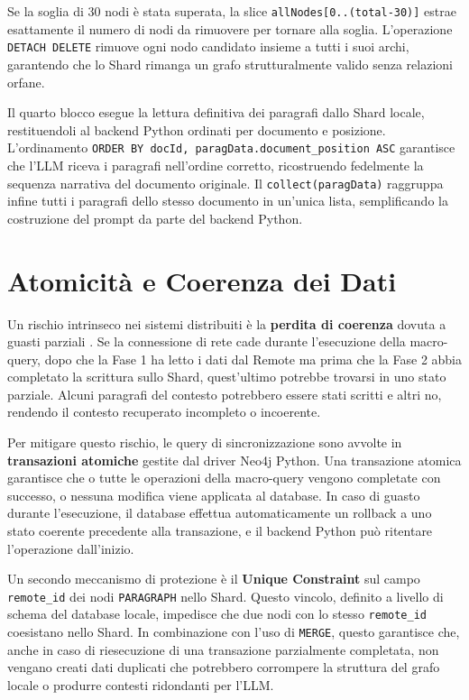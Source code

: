Se la soglia di 30 nodi è stata superata, la slice \texttt{allNodes[0..(total-30)]} estrae esattamente il numero di nodi da rimuovere per tornare alla soglia. L'operazione \texttt{DETACH DELETE} rimuove ogni nodo candidato insieme a tutti i suoi archi, garantendo che lo Shard rimanga un grafo strutturalmente valido senza relazioni orfane.

Il quarto blocco esegue la lettura definitiva dei paragrafi dallo Shard locale, restituendoli al backend Python ordinati per documento e posizione. L'ordinamento \texttt{ORDER BY docId, paragData.document\_position ASC} garantisce che l'LLM riceva i paragrafi nell'ordine corretto, ricostruendo fedelmente la sequenza narrativa del documento originale. Il \texttt{collect(paragData)} raggruppa infine tutti i paragrafi dello stesso documento in un'unica lista, semplificando la costruzione del prompt da parte del backend Python.

\section{Atomicità e Coerenza dei Dati}

Un rischio intrinseco nei sistemi distribuiti è la \textbf{perdita di coerenza} dovuta a guasti parziali \cite{kleppmann2017}. Se la connessione di rete cade durante l'esecuzione della macro-query, dopo che la Fase 1 ha letto i dati dal Remote ma prima che la Fase 2 abbia completato la scrittura sullo Shard, quest'ultimo potrebbe trovarsi in uno stato parziale. Alcuni paragrafi del contesto potrebbero essere stati scritti e altri no, rendendo il contesto recuperato incompleto o incoerente.

Per mitigare questo rischio, le query di sincronizzazione sono avvolte in \textbf{transazioni atomiche} gestite dal driver Neo4j Python. Una transazione atomica garantisce che o tutte le operazioni della macro-query vengono completate con successo, o nessuna modifica viene applicata al database. In caso di guasto durante l'esecuzione, il database effettua automaticamente un rollback a uno stato coerente precedente alla transazione, e il backend Python può ritentare l'operazione dall'inizio.

Un secondo meccanismo di protezione è il \textbf{Unique Constraint} sul campo \texttt{remote\_id} dei nodi \texttt{PARAGRAPH} nello Shard. Questo vincolo, definito a livello di schema del database locale, impedisce che due nodi con lo stesso \texttt{remote\_id} coesistano nello Shard. In combinazione con l'uso di \texttt{MERGE}, questo garantisce che, anche in caso di riesecuzione di una transazione parzialmente completata, non vengano creati dati duplicati che potrebbero corrompere la struttura del grafo locale o produrre contesti ridondanti per l'LLM.

